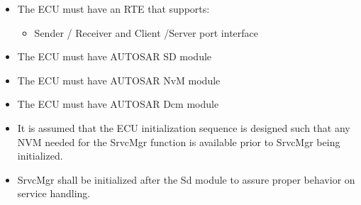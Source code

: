 \begin{itemize}
\item The ECU must have an RTE that supports:
  \begin{itemize}
  \item Sender / Receiver and Client /Server port interface
  \end{itemize}
\item The ECU must have AUTOSAR SD module
\item The ECU must have AUTOSAR NvM module
\item The ECU must have AUTOSAR Dcm module
\item It is assumed that the ECU initialization sequence is designed such that any NVM needed for the SrvcMgr function is available prior to SrvcMgr being initialized.
\item SrvcMgr shall be initialized after the Sd module to assure proper behavior on service handling.
\end{itemize}
